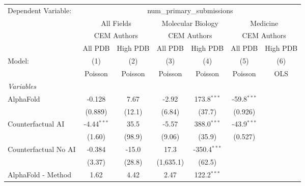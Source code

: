 \begingroup
\centering
\begin{tabular}{lcccccc}
   \tabularnewline \midrule \midrule
   Dependent Variable: & \multicolumn{6}{c}{num\_primary\_submissions}\\
 & \multicolumn{2}{c}{All Fields} & \multicolumn{2}{c}{Molecular Biology} & \multicolumn{2}{c}{Medicine} \\
\cmidrule(lr){2-3} \cmidrule(lr){4-5} \cmidrule(lr){6-7}
 & \multicolumn{2}{c}{CEM Authors} & \multicolumn{2}{c}{CEM Authors} & \multicolumn{2}{c}{CEM Authors} \\
\cmidrule(lr){2-3} \cmidrule(lr){4-5} \cmidrule(lr){6-7}
 & \multicolumn{1}{c}{All PDB} & \multicolumn{1}{c}{High PDB} & \multicolumn{1}{c}{All PDB} & \multicolumn{1}{c}{High PDB} & \multicolumn{1}{c}{All PDB} & \multicolumn{1}{c}{High PDB} \\
\cmidrule(lr){2-2} \cmidrule(lr){3-3} \cmidrule(lr){4-4} \cmidrule(lr){5-5} \cmidrule(lr){6-6} \cmidrule(lr){7-7}
   Model:                                                     & (1)           & (2)        & (3)       & (4)            & (5)           & (6)\\  
                                                              &  Poisson      & Poisson    & Poisson   & Poisson        & Poisson       & OLS\\  
   \midrule
   \emph{Variables}\\
   AlphaFold                                                  & -0.128        & 7.67       & -2.92     & 173.8$^{***}$  & -59.8$^{***}$ &   \\   
                                                              & (0.889)       & (12.1)     & (6.84)    & (37.7)         & (0.926)       &   \\   
   Counterfactual AI                                          & -4.44$^{***}$ & 35.5       & -5.57     & 388.0$^{***}$  & -43.9$^{***}$ &   \\   
                                                              & (1.60)        & (98.9)     & (9.06)    & (35.9)         & (0.527)       &   \\   
   Counterfactual No AI                                       & -0.384        & -15.0      & 17.3      & -350.4$^{***}$ &               &   \\   
                                                              & (3.37)        & (28.8)     & (1,635.1) & (62.5)         &               &   \\   
   AlphaFold - Method                                         & 1.62          & 4.42       & 2.47      & 122.2$^{***}$  &               &   \\   

\end{tabular}

